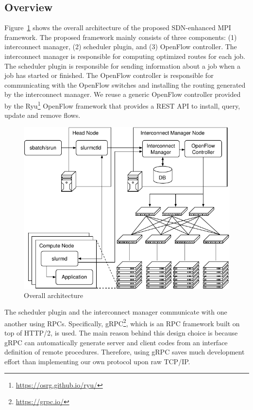 \documentclass[graybox]{svmult}
\begin{document}
\subsection{Overview}

Figure~\ref{kt:fig:architecture} shows the overall architecture of the
proposed SDN-enhanced MPI framework. The proposed framework mainly consists of
three components: (1) interconnect manager, (2) scheduler plugin, and (3)
OpenFlow controller. The interconnect manager is responsible for computing
optimized routes  for each job. The scheduler plugin is responsible
for sending information about a job when a job has started or finished. The
OpenFlow controller is responsible for communicating with the OpenFlow
switches and installing the routing generated by the interconnect manager.
We reuse a generic OpenFlow controller provided by the
Ryu\footnote{\url{https://osrg.github.io/ryu/}} OpenFlow framework that
provides a REST API to install, query, update and remove flows.

\begin{figure}
    \centering
    \includegraphics{architecture}
    \caption{Overall architecture}%
    \label{kt:fig:architecture}
\end{figure}

The scheduler plugin and the interconnect manager communicate with
one another using RPCs. Specifically, gRPC\footnote{\url{https://grpc.io/}}, which is an
RPC framework built on top of HTTP/2, is used. The main reason behind this
design choice is because gRPC can automatically generate server and client
codes from an interface definition of remote procedures. Therefore, using gRPC
saves much development effort than implementing our own protocol upon raw
TCP/IP\@.
\end{document}
